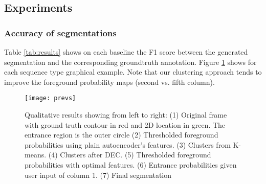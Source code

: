 \subsection{Experiments}
\subsubsection{Accuracy of segmentations}
Table \ref{tab:results} shows on each baseline the F1 score between the generated segmentation and the corresponding groundtruth annotation.
Figure \ref{fig:qualitative} shows for each sequence type graphical example.
Note that our clustering approach tends to improve the foreground probability maps (second vs. fifth column).



\begin{figure}[h!]
\centering
\texttt{[image: prevs]}
\caption{Qualitative results showing from left to right: (1) Original frame with ground truth contour in red and 2D location in green. The entrance region is the outer circle (2) Thresholded foreground probabilities using plain autoencoder's features. (3) Clusters from K-means. (4) Clusters after DEC. (5) Thresholded foreground probabilities with optimal features. (6) Entrance probabilities given user input of column 1. (7) Final segmentation}
\label{fig:qualitative}
\end{figure}


